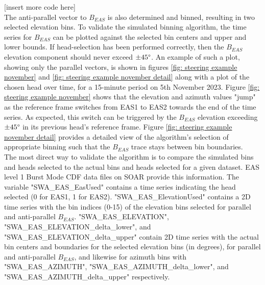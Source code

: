 [insert more code here]
\\

The anti-parallel vector to \(B_{EAS}\) is also determined and binned, resulting in two selected elevation bins. 
To validate the simulated binning algorithm, the time series for \(B_{EAS}\) can be plotted against the selected bin centers and upper and lower bounds. If head-selection has been performed correctly, then the \(B_{EAS}\) elevation component should never exceed \(\pm45\degree\). An example of such a plot, showing only the parallel vectors, is shown in figures \ref{fig: steering example november} and \ref{fig: steering example november detail} along with a plot of the chosen head over time, for a 15-minute period on 5th November 2023. Figure \ref{fig: steering example november} shows that the elevation and azimuth values "jump" as the reference frame switches from EAS1 to EAS2 towards the end of the time series. As expected, this switch can be triggered by the \(B_{EAS}\) elevation exceeding \(\pm45\degree\) in its previous head's reference frame. Figure \ref{fig: steering example november detail} provides a detailed view of the algorithm's selection of appropriate binning such that the \(B_{EAS}\) trace stays between bin boundaries.
\\

The most direct way to validate the algorithm is to compare the simulated bins and heads selected to the actual bins and heads selected for a given dataset. EAS level 1 Burst Mode CDF data files on SOAR provide this information. The variable "SWA\_EAS\_EasUsed" contains a time series indicating the head selected (0 for EAS1, 1 for EAS2). "SWA\_EAS\_ElevationUsed" contains a 2D time series with the bin indices (0-15) of the elevation bins selected for parallel and anti-parallel \(B_{EAS}\). "SWA\_EAS\_ELEVATION", "SWA\_EAS\_ELEVATION\_delta\_lower", and "SWA\_EAS\_ELEVATION\_delta\_upper" contain 2D time series with the actual bin centers and boundaries for the selected elevation bins (in degrees), for parallel and anti-parallel \(B_{EAS}\), and likewise for azimuth bins with "SWA\_EAS\_AZIMUTH", "SWA\_EAS\_AZIMUTH\_delta\_lower", and "SWA\_EAS\_AZIMUTH\_delta\_upper" respectively.


